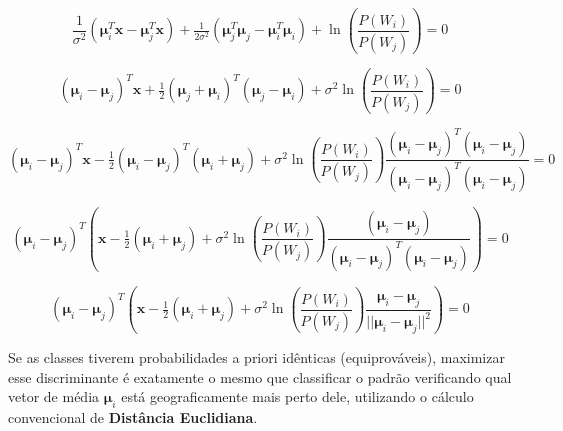 \documentclass[12pt, a4paper]{article}
\begin{document}
\begin{equation*}
    \frac{1}{\sigma^2}
    \left(\boldsymbol{\mu}_i^T\mathbf{x} 
    - \boldsymbol{\mu}_j^T\mathbf{x} \right) 
    + \tfrac{1}{2\sigma^2}
    \left(\boldsymbol{\mu}_j^T\boldsymbol{\mu}_j
    -\boldsymbol{\mu}_i^T\boldsymbol{\mu}_i \right)
    + \ln \left(\frac{P(W_i)}{P(W_j)}\right)
    = 0
\end{equation*}

\begin{equation*}
    (\boldsymbol{\mu}_i - \boldsymbol{\mu}_j)^T\mathbf{x} 
    + \tfrac{1}{2}
    (\boldsymbol{\mu}_j + \boldsymbol{\mu}_i)^T(\boldsymbol{\mu}_j - \boldsymbol{\mu}_i)
    + \sigma^2 \ln \left(\frac{P(W_i)}{P(W_j)}\right)
    = 0
\end{equation*}


\begin{equation*}
    (\boldsymbol{\mu}_i - \boldsymbol{\mu}_j)^T\mathbf{x} 
    - \tfrac{1}{2}
    (\boldsymbol{\mu}_i - \boldsymbol{\mu}_j)^T(\boldsymbol{\mu}_i + \boldsymbol{\mu}_j)
    + \sigma^2 \ln \left(\frac{P(W_i)}{P(W_j)}\right)
    \frac{(\boldsymbol{\mu}_i - \boldsymbol{\mu}_j)^T(\boldsymbol{\mu}_i - \boldsymbol{\mu}_j)}{(\boldsymbol{\mu}_i - \boldsymbol{\mu}_j)^T(\boldsymbol{\mu}_i - \boldsymbol{\mu}_j)}
    = 0
\end{equation*}

\begin{equation*}
    (\boldsymbol{\mu}_i - \boldsymbol{\mu}_j)^T
    \left(
    \mathbf{x} 
    - \tfrac{1}{2}
    (\boldsymbol{\mu}_i + \boldsymbol{\mu}_j)
    + \sigma^2 \ln \left(\frac{P(W_i)}{P(W_j)}\right)
    \frac{(\boldsymbol{\mu}_i - \boldsymbol{\mu}_j)}{(\boldsymbol{\mu}_i - \boldsymbol{\mu}_j)^T(\boldsymbol{\mu}_i - \boldsymbol{\mu}_j)}
    \right)
    = 0
\end{equation*}

\begin{equation*}
    (\boldsymbol{\mu}_i - \boldsymbol{\mu}_j)^T
    \left(
    \mathbf{x} 
    - \tfrac{1}{2}
    (\boldsymbol{\mu}_i + \boldsymbol{\mu}_j)
    + \sigma^2 \ln \left(\frac{P(W_i)}{P(W_j)}\right)
    \frac{\boldsymbol{\mu}_i - \boldsymbol{\mu}_j}{||\boldsymbol{\mu}_i - \boldsymbol{\mu}_j||^2}
    \right)
    = 0
\end{equation*}



Se as classes tiverem probabilidades a priori idênticas (equiprováveis), maximizar esse discriminante é exatamente o mesmo que classificar o padrão verificando qual vetor de média $\boldsymbol{\mu}_i$ está geograficamente mais perto dele, utilizando o cálculo convencional de \textbf{Distância Euclidiana}.
\end{document}
